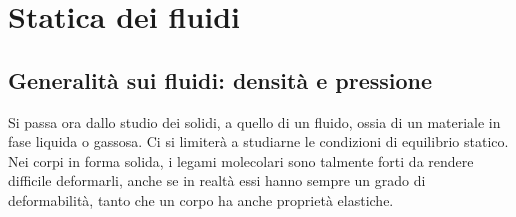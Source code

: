 \documentclass[10pt,a4paper]{book}
\begin{document}
\chapter{Statica dei fluidi}

\section{Generalità sui fluidi: densità e pressione}

Si passa ora dallo studio dei solidi, a quello di un fluido, ossia di un materiale in fase liquida o gassosa. Ci si limiterà a studiarne le condizioni di equilibrio statico. Nei corpi in forma solida, i legami molecolari sono talmente forti da rendere difficile deformarli, anche se in realtà essi hanno sempre un grado di deformabilità, tanto che un corpo ha anche proprietà elastiche.
\end{document}
